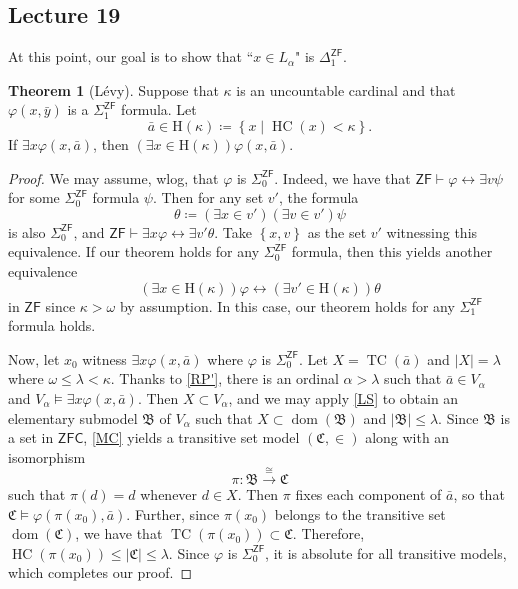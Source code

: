 \documentclass[10pt,letterpaper,cm]{nupset}
\theoremstyle{definition}
\theoremstyle{theorem}
\newtheorem{theorem}[definition]{Theorem}
\theoremstyle{remark}
\newcommand{\C}{\mathfrak C}
\newcommand{\B}{\mathfrak{B}}
\newcommand{\1}{\mathbf{1}}
\newcommand{\0}{\vec 0}
\newcommand{\zf}{\mathsf{ZF}}
\newcommand{\zfc}{\mathsf{ZFC}}
\DeclareMathOperator{\dom}{dom}
\DeclareMathOperator{\hc}{HC}
\DeclareMathOperator{\tc}{TC}
\begin{document}
\subsection{Lecture 19}

At this point, our goal is to show that ``$x\in L_{\alpha}$" is $\Delta_1^{\zf}$.

\begin{theorem}[L\'evy]
Suppose that $\kappa$ is an uncountable cardinal and that $\varphi(x, \bar{y})$ is a $\Sigma_1^{\zf}$ formula. Let $$\bar{a} \in \mathrm{H}(\kappa) \coloneqq \left\{x \mid \hc(x)<\kappa\right\}.$$ If $\exists{x}\varphi(x, \bar{a})$, then $\left(\exists{x \in \mathrm{H}(\kappa)}\right)\varphi(x, \bar{a})$.
\end{theorem}
\begin{proof}
We may assume, wlog, that $\varphi$ is $\Sigma_0^{\zf}$. Indeed, we have that $\zf \vdash \varphi \leftrightarrow \exists{v}\psi$ for some $\Sigma_0^{\zf}$ formula $\psi$. Then for any set $v'$, the formula
\[
\theta \coloneqq \left(\exists{x\in v'}\right)\left(\exists{v\in v'}\right)\psi
\] is also $\Sigma_0^{\zf}$, and $\zf \vdash \exists{x}\varphi \leftrightarrow \exists{v'}\theta$. Take $\left\{x,v\right\}$ as the set $v'$ witnessing this equivalence. If  our theorem holds for any $\Sigma_0^{\zf}$ formula, then this yields another equivalence
\[
\left(\exists{x \in \mathrm{H}(\kappa)}\right)\varphi \leftrightarrow \left(\exists{v' \in \mathrm{H}(\kappa)}\right)\theta
\] in $\zf$ since $\kappa >\omega$ by assumption. In this case, our theorem holds for any $\Sigma_1^{\zf}$ formula holds.

\smallskip

Now, let $x_0$ witness $\exists{x}\varphi(x, \bar{a})$ where $\varphi$ is $\Sigma_0^{\zf}$. Let $X = \tc(\bar{a})$ and $\lvert{X}\rvert = \lambda$ where $\omega \leq \lambda <\kappa$. Thanks to \cref{RP'}, there is an ordinal $\alpha >\lambda $ such that $\bar{a}\in V_{\alpha}$ and $V_{\alpha} \models \exists{x}\varphi(x,\bar{a})$. Then $X\subset V_{\alpha}$, and we may  apply \cref{LS} to obtain an elementary submodel $\B$ of $V_{\alpha}$ such that $X \subset \dom(\B)$ and $\left\lvert{\B}\right\rvert \leq \lambda$. Since $\B$ is a set in $\zfc$, \cref{MC} yields a transitive set model $\left(\C, \in\right)$ along with an isomorphism
\[
\pi : \B \overset{\cong}{\longrightarrow} \C
\] such that $\pi(d) =d$ whenever $d \in X$. Then $\pi$ fixes each component of $\bar{a}$, so that $\C \models \varphi(\pi(x_0), \bar{a})$.  Further, since $\pi(x_0)$ belongs to the transitive set $\dom(\C)$, we have that $\tc(\pi(x_0)) \subset \C$. Therefore, $\hc(\pi(x_0)) \leq \left\lvert{\C}\right\rvert \leq \lambda$. Since $\varphi$ is $\Sigma_0^{\zf}$, it is absolute for all transitive models, which completes our proof.
\end{proof}
\end{document}
